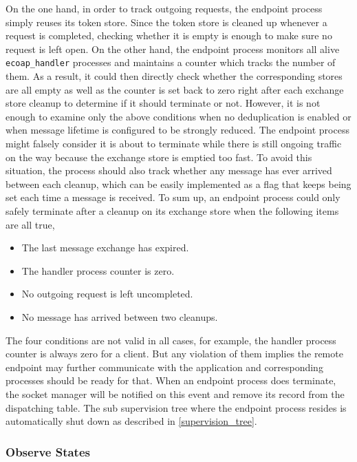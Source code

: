 On the one hand, in order to track outgoing requests, the endpoint process simply reuses its token store. Since the token store is cleaned up whenever a request is completed, checking whether it is empty is enough to make sure no request is left open. On the other hand, the endpoint process monitors all alive \verb|ecoap_handler| processes and maintains a counter which tracks the number of them. As a result, it could then directly check whether the corresponding stores are all empty as well as the counter is set back to zero right after each exchange store cleanup to determine if it should terminate or not. However, it is not enough to examine only the above conditions when no deduplication is enabled or when message lifetime is configured to be strongly reduced. The endpoint process might falsely consider it is about to terminate while there is still ongoing traffic on the way because the exchange store is emptied too fast. To avoid this situation, the process should also track whether any message has ever arrived between each cleanup, which can be easily implemented as a flag that keeps being set each time a message is received. To sum up, an endpoint process could only safely terminate after a cleanup on its exchange store when the following items are all true,

\begin{itemize}

\item The last message exchange has expired.
\item The handler process counter is zero.
\item No outgoing request is left uncompleted.
\item No message has arrived between two cleanups. 

\end{itemize}

The four conditions are not valid in all cases, for example, the handler process counter is always zero for a client. But any violation of them implies the remote endpoint may further communicate with the application and corresponding processes should be ready for that. When an endpoint process does terminate, the socket manager will be notified on this event and remove its record from the dispatching table. The sub supervision tree where the endpoint process resides is automatically shut down as described in \autoref{supervision_tree}. 

\subsubsection{Observe States}

